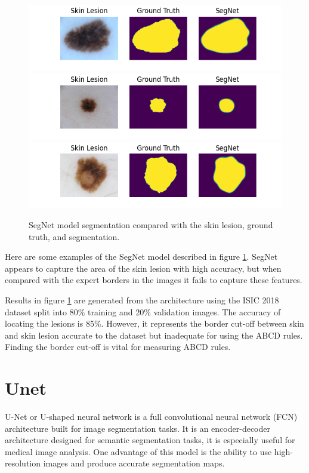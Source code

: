 \begin{figure}[]
    \centering
    \includegraphics[scale=1.0]{images/segmentation/SegNet-1.png}
    \includegraphics[scale=1.0]{images/segmentation/SegNet-2.png}
    \includegraphics[scale=1.0]{images/segmentation/SegNet-3.png}
    \caption{SegNet model segmentation compared with the skin lesion, ground truth, and segmentation.}\label{SegNet-examples}
\end{figure}

Here are some examples of the SegNet model described in figure \ref{SegNet-examples}. SegNet appears to capture the area of the skin lesion with high accuracy, but when compared with the expert borders in the images it fails to capture these features.

Results in figure \ref{SegNet-examples} are generated from the architecture using the ISIC 2018 dataset split into 80\% training and 20\% validation images. The accuracy of locating the lesions is 85\%. However, it represents the border cut-off between skin and skin lesion accurate to the dataset but inadequate for using the ABCD rules. Finding the border cut-off is vital for measuring ABCD rules\cite{Pereira2020}.

\section{Unet}
U-Net or U-shaped neural network is a full convolutional neural network (FCN) architecture built for image segmentation tasks. It is an encoder-decoder architecture designed for semantic segmentation tasks, it is especially useful for medical image analysis\cite{zhou2020}. One advantage of this model is the ability to use high-resolution images and produce accurate segmentation maps.

